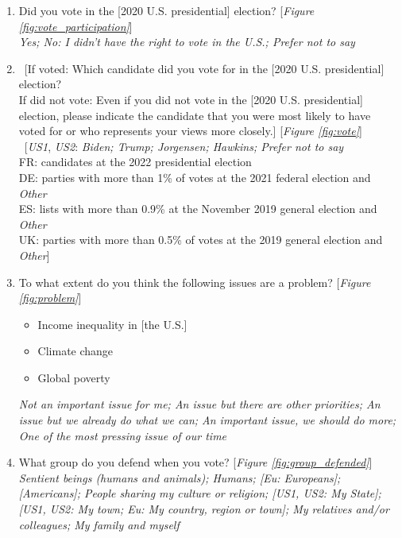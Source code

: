 \documentclass[12pt,english]{article}
\begin{document}
\begin{enumerate}[resume]
\item \label{q:vote_participation} Did you vote in the [2020 U.S. presidential] election?  [\textit{Figure \ref{fig:vote_participation}}]
\\ \textit{Yes; No: I didn't have the right to vote in the U.S.; Prefer not to say}
\item \label{q:vote} ~[If voted: Which candidate did you vote for in the [2020 U.S. presidential] election? \\ If did not vote: Even if you did not vote in the [2020 U.S. presidential] election, please indicate the candidate that you were most likely to have voted for or who represents your views more closely.] [\textit{Figure \ref{fig:vote}}]
\\ ~[\textit{US1}, \textit{US2}: \textit{Biden; Trump; Jorgensen; Hawkins; Prefer not to say}\\ FR: candidates at the 2022 presidential election\\ DE: parties with more than 1\% of votes at the 2021 federal election and \textit{Other}\\ ES: lists with more than 0.9\% at the November 2019 general election and \textit{Other}\\ UK: parties with more than 0.5\% of votes at the 2019 general election and \textit{Other}]
\item \label{q:problem} To what extent do you think the following issues are a problem? [\textit{Figure \ref{fig:problem}}]
\begin{itemize}
    \item Income inequality in [the U.S.] 
    \item Climate change
    \item Global poverty
\end{itemize}
\textit{Not an important issue for me; An issue but there are other priorities; An issue but we already do what we can; An important issue, we should do more; One of the most pressing issue of our time}
\item \label{q:group_defended} What group do you defend when you vote? [\textit{Figure \ref{fig:group_defended}}]
\\ \textit{Sentient beings (humans and animals); Humans; [Eu: Europeans]; [Americans]; People sharing my culture or religion; [US1, \textit{US2}: My State]; [US1, \textit{US2}: My town; Eu: My country, region or town]; My relatives and/or colleagues; My family and myself}
\end{enumerate}
\end{document}
